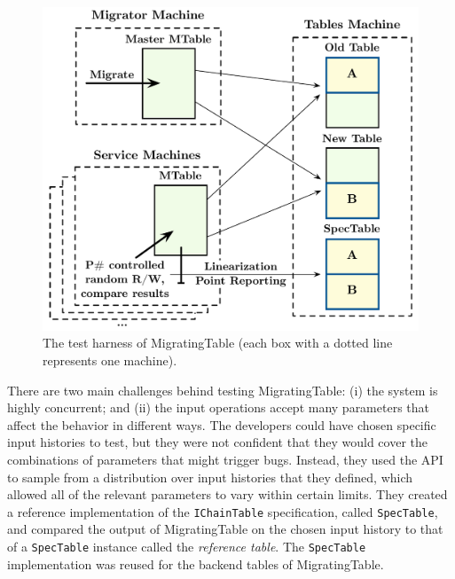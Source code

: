 \begin{figure}[t]
\centering
\includegraphics[width=\linewidth]{img/modeled_migration}
\caption{The \psharp test harness of MigratingTable (each box with a dotted line represents one \psharp machine).}
\label{fig:mockedmigration}
\end{figure}

There are two main challenges behind testing MigratingTable: (i) the system is highly concurrent; and (ii) the input operations accept many parameters that affect the behavior in different ways. The developers could have chosen specific input histories to test, but they were not confident that they would cover the combinations of parameters that might trigger bugs. Instead, they used the \psharp API to sample from a distribution over input histories that they defined, which allowed all of the relevant parameters to vary within certain limits. They created a reference implementation of the \texttt{IChainTable} specification, called \texttt{SpecTable}, and compared the output of MigratingTable on the chosen input history to that of a \texttt{SpecTable} instance called the \emph{reference table}. The \texttt{SpecTable} implementation was reused for the backend tables of MigratingTable.

